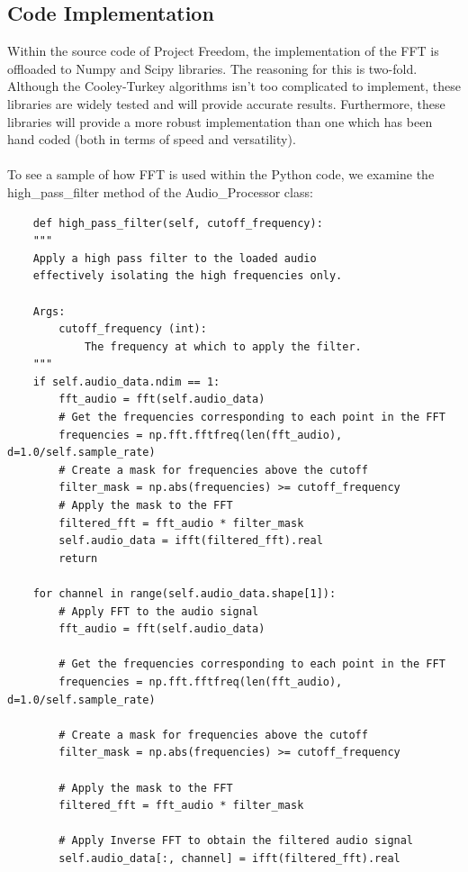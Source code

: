 \documentclass[notitlepage]{article}
\begin{document}
\subsection{Code Implementation}

Within the source code of Project Freedom, the implementation of the FFT
is offloaded to Numpy and Scipy libraries. The reasoning for this is two-fold.
Although the Cooley-Turkey algorithms isn't too complicated to implement,
these libraries are widely tested and will provide accurate results. Furthermore,
these libraries will provide a more robust implementation than one which has been hand coded
(both in terms of speed and versatility).
\\\\
To see a sample of how FFT is used within the Python code, we examine the
high\_pass\_filter method of the Audio\_Processor class:
\begin{lstlisting}
    def high_pass_filter(self, cutoff_frequency):
    """
    Apply a high pass filter to the loaded audio
    effectively isolating the high frequencies only.

    Args:
        cutoff_frequency (int): 
            The frequency at which to apply the filter.
    """
    if self.audio_data.ndim == 1:
        fft_audio = fft(self.audio_data)
        # Get the frequencies corresponding to each point in the FFT
        frequencies = np.fft.fftfreq(len(fft_audio), d=1.0/self.sample_rate)
        # Create a mask for frequencies above the cutoff
        filter_mask = np.abs(frequencies) >= cutoff_frequency
        # Apply the mask to the FFT
        filtered_fft = fft_audio * filter_mask
        self.audio_data = ifft(filtered_fft).real
        return
    
    for channel in range(self.audio_data.shape[1]):
        # Apply FFT to the audio signal
        fft_audio = fft(self.audio_data)

        # Get the frequencies corresponding to each point in the FFT
        frequencies = np.fft.fftfreq(len(fft_audio), d=1.0/self.sample_rate)

        # Create a mask for frequencies above the cutoff
        filter_mask = np.abs(frequencies) >= cutoff_frequency

        # Apply the mask to the FFT
        filtered_fft = fft_audio * filter_mask

        # Apply Inverse FFT to obtain the filtered audio signal
        self.audio_data[:, channel] = ifft(filtered_fft).real
\end{lstlisting}
\end{document}
